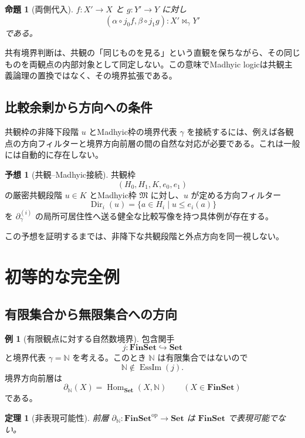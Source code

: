 \documentclass[a4paper,11pt]{ltjsarticle}
\theoremstyle{definition}
\newtheorem{example}[definition]{例}
\newtheorem{conjecture}[definition]{予想}
\theoremstyle{plain}
\newtheorem{theorem}[definition]{定理}
\newtheorem{proposition}[definition]{命題}
\newcommand{\EssIm}{\operatorname{EssIm}}
\newcommand{\Hom}{\operatorname{Hom}}
\newcommand{\Dir}{\operatorname{Dir}}
\newcommand{\Set}{\mathbf{Set}}
\newcommand{\FinSet}{\mathbf{FinSet}}
\begin{document}
\begin{proposition}[両側代入]
$f:X'\to X$ と $g:Y'\to Y$ に対し
\[
 (\alpha\circ j_0f,\beta\circ j_1g):
 X'\bowtie_\gamma Y'
\]
である。
\end{proposition}

共有境界判断は、共観の「同じものを見る」という直観を保ちながら、その同じものを両観点の内部対象として同定しない。この意味でMadhyic logicは共観主義論理の置換ではなく、その境界拡張である。

\subsection{比較余剰から方向への条件}

共観枠の非降下段階 $u$ とMadhyic枠の境界代表 $\gamma$ を接続するには、例えば各観点の方向フィルターと境界方向前層の間の自然な対応が必要である。これは一般には自動的に存在しない。

\begin{conjecture}[共観--Madhyic接続]
共観枠
\[
 (H_0,H_1,K,e_0,e_1)
\]
の厳密共観段階 $u\in K$ とMadhyic枠 $\mathfrak M$ に対し、$u$ が定める方向フィルター
\[
 \Dir_i(u)=\{a\in H_i\mid u\leq e_i(a)\}
\]
を $\partial_\gamma^{(i)}$ の局所可居住性へ送る健全な比較写像を持つ具体例が存在する。
\end{conjecture}

この予想を証明するまでは、非降下な共観段階と外点方向を同一視しない。

\section{初等的な完全例}

\subsection{有限集合から無限集合への方向}

\begin{example}[有限観点に対する自然数境界]
包含関手
\[
 j:\FinSet\hookrightarrow\Set
\]
と境界代表 $\gamma=\mathbb N$ を考える。このとき $\mathbb N$ は有限集合ではないので
\[
 \mathbb N\notin\EssIm(j).
\]
境界方向前層は
\begin{equation}
 \partial_{\mathbb N}(X)
 =\Hom_{\Set}(X,\mathbb N)
 \qquad(X\in\FinSet)
 \label{eq:finset-boundary}
\end{equation}
である。
\end{example}

\begin{theorem}[非表現可能性]
前層 $\partial_{\mathbb N}:\FinSet^{\mathrm{op}}\to\Set$ は $\FinSet$ で表現可能でない。
\end{theorem}
\end{document}
